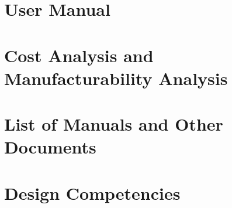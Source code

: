 
\section{User Manual}


\section{Cost Analysis and Manufacturability Analysis}






\section{List of Manuals and Other Documents}


\section{Design Competencies}



